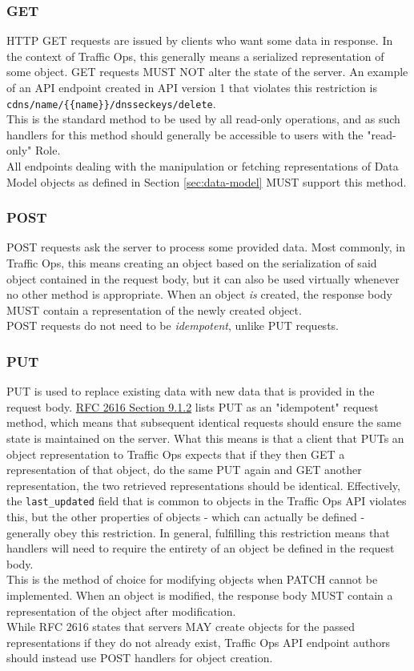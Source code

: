 \documentclass{article}
\newcommand{\code}[1]{\texttt{\color{inlinecodecolor}#1}}
\begin{document}
\subsubsection{GET}
HTTP GET requests are issued by clients who want some data in response. In the context of Traffic Ops, this generally means a serialized
representation of some object. GET requests MUST NOT alter the state of the server. An example of an API endpoint created in API version 1
that violates this restriction is \code{cdns/name/\{\{name\}\}/dnsseckeys/delete}.\\
This is the standard method to be used by all read-only operations, and as such handlers for this method should generally be accessible to
users with the "read-only" Role.\\
All endpoints dealing with the manipulation or fetching representations of Data Model objects as defined in Section \ref{sec:data-model}
MUST support this method.

\subsubsection{POST}
POST requests ask the server to process some provided data. Most commonly, in Traffic Ops, this means creating an object based on the serialization
of said object contained in the request body, but it can also be used virtually whenever no other method is appropriate. When an object \emph{is}
created, the response body MUST contain a representation of the newly created object.\\
POST requests do not need to be \emph{idempotent}, unlike PUT requests.

\subsubsection{PUT}
PUT is used to replace existing data with new data that is provided in the request body.
\href{https://tools.ietf.org/html/rfc2616#section-9.1.2}{RFC 2616 Section 9.1.2} lists PUT as an "idempotent" request method, which means that
subsequent identical requests should ensure the same state is maintained on the server. What this means is that a client that PUTs an object
representation to Traffic Ops expects that if they then GET a representation of that object, do the same PUT again and GET another representation,
the two retrieved representations should be identical. Effectively, the \code{last\_updated} field that is common to objects in the Traffic Ops API
violates this, but the other properties of objects - which can actually be defined - generally obey this restriction. In general, fulfilling this
restriction means that handlers will need to require the entirety of an object be defined in the request body.\\
This is the method of choice for modifying objects when PATCH cannot be implemented. When an object is modified, the response body MUST contain a
representation of the object after modification.\\
While RFC 2616 states that servers MAY create objects for the passed representations if they do not already exist, Traffic Ops API endpoint authors
should instead use POST handlers for object creation.
\end{document}
